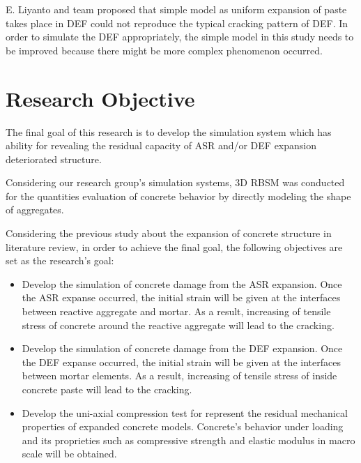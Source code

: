 \begin{itemize}
    E. Liyanto and team proposed that simple model as uniform expansion of paste takes place in DEF could not reproduce the typical cracking pattern of DEF. In order to simulate the DEF appropriately, the simple model in this study needs to be improved because there might be more complex phenomenon occurred.

\end{itemize}

\section{Research Objective}

The final goal of this research is to develop the simulation system which has ability for revealing the residual capacity of ASR and/or DEF expansion deteriorated structure.

Considering our research group’s simulation systems, 3D RBSM was conducted for the quantities evaluation of concrete behavior by directly modeling the shape of aggregates.

Considering the previous study about the expansion of concrete structure in literature review, in order to achieve the final goal, the following objectives are set as the research’s goal:

\begin{itemize}

    \item Develop the simulation of concrete damage from the ASR expansion. Once the ASR expanse occurred, the initial strain will be given at the interfaces between reactive aggregate and mortar. As a result, increasing of tensile stress of concrete around the reactive aggregate will lead to the cracking.

    \item Develop the simulation of concrete damage from the DEF expansion. Once the DEF expanse occurred, the initial strain will be given at the interfaces between mortar elements. As a result, increasing of tensile stress of inside concrete paste will lead to the cracking.

    \item Develop the uni-axial compression test for represent the residual mechanical properties of expanded concrete models. Concrete's behavior under loading and its proprieties such as compressive strength and elastic modulus in macro scale will be obtained.

\end{itemize}

